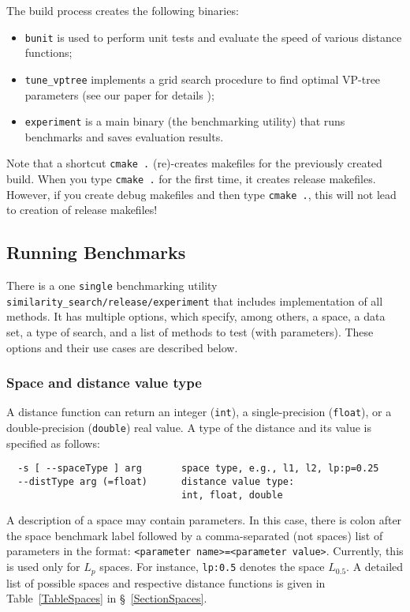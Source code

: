 \documentclass[runningheads,a4paper]{llncs}
\newcommand{\ttt}[1]{\texttt{#1}}
\begin{document}
The build process creates the following binaries:
\begin{itemize}
\item \ttt{bunit} is used to perform unit tests and 
evaluate the speed of various distance functions;
\item \ttt{tune\_vptree} implements a grid search procedure to find optimal VP-tree parameters (see our paper for details \cite{Boytsov_and_Bilegsaikhan:nips2013});
\item \ttt{experiment} is a main binary (the benchmarking utility) that runs benchmarks and saves evaluation results.
\end{itemize}

Note that a shortcut \ttt{cmake .} (re)-creates makefiles for the previously 
created build. When you type \ttt{cmake .} for the first time,
it creates release makefiles. However, if you create debug
makefiles and then type \ttt{cmake .}, 
this will not lead to creation of release makefiles! 

\subsection{Running Benchmarks}\label{SectionRunBenchmark}
There is a one \ttt{single} benchmarking utility \ttt{similarity\_search/release/experiment} 
that includes implementation of all methods.
It has multiple options, which specify, among others, 
a space, a data set, a type of search, and a list of methods to test (with parameters).
These options and their use cases are described below.

\subsubsection{Space and distance value type}

A distance function can return an integer (\ttt{int}), a single-precision (\ttt{float}),
or a double-precision (\ttt{double}) real value.
A type of the distance and its value is specified as follows:

\begin{verbatim}
  -s [ --spaceType ] arg       space type, e.g., l1, l2, lp:p=0.25
  --distType arg (=float)      distance value type: 
                               int, float, double
\end{verbatim}

A description of a space may contain parameters.
In this case, there is colon after the space benchmark label followed by a
comma-separated (not spaces) list of parameters in the format:
\ttt{<parameter name>=<parameter value>}.
Currently, this is used only for $L_p$ spaces. For instance,
 \ttt{lp:0.5} denotes the space $L_{0.5}$.
A detailed list of possible spaces and respective
distance functions is given in Table~\ref{TableSpaces} in \S~\ref{SectionSpaces}.
\end{document}
